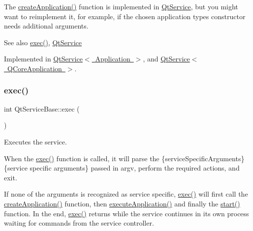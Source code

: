 The \mbox{\hyperlink{class_qt_service_base_ac5ae73935f489282b35c70b27b341390}{create\+Application()}} function is implemented in \mbox{\hyperlink{class_qt_service}{Qt\+Service}}, but you might want to reimplement it, for example, if the chosen application type\textquotesingle{}s constructor needs additional arguments.

\begin{DoxySeeAlso}{See also}
\mbox{\hyperlink{class_qt_service_base_afae2e589de71c1ae3ae8db3dc9ab9c64}{exec()}}, \mbox{\hyperlink{class_qt_service}{Qt\+Service}} 
\end{DoxySeeAlso}


Implemented in \mbox{\hyperlink{class_qt_service_a50aa2079345abfd0b1284be47e245b0b}{Qt\+Service$<$ Application $>$}}, and \mbox{\hyperlink{class_qt_service_a50aa2079345abfd0b1284be47e245b0b}{Qt\+Service$<$ Q\+Core\+Application $>$}}.

\mbox{\label{class_qt_service_base_afae2e589de71c1ae3ae8db3dc9ab9c64}} 
\subsubsection{\texorpdfstring{exec()}{exec()}}
{\footnotesize\ttfamily int Qt\+Service\+Base\+::exec (\begin{DoxyParamCaption}{ }\end{DoxyParamCaption})}

Executes the service.

When the \mbox{\hyperlink{class_qt_service_base_afae2e589de71c1ae3ae8db3dc9ab9c64}{exec()}} function is called, it will parse the  \{service\+Specific\+Arguments\} \{service specific arguments\} passed in {\ttfamily argv}, perform the required actions, and exit.

If none of the arguments is recognized as service specific, \mbox{\hyperlink{class_qt_service_base_afae2e589de71c1ae3ae8db3dc9ab9c64}{exec()}} will first call the \mbox{\hyperlink{class_qt_service_base_ac5ae73935f489282b35c70b27b341390}{create\+Application()}} function, then \mbox{\hyperlink{class_qt_service_base_ab70633cd29a22758dfa0502b77e564f6}{execute\+Application()}} and finally the \mbox{\hyperlink{class_qt_service_base_adbc0cd621b41bd3a6a1f62fda432e9e4}{start()}} function. In the end, \mbox{\hyperlink{class_qt_service_base_afae2e589de71c1ae3ae8db3dc9ab9c64}{exec()}} returns while the service continues in its own process waiting for commands from the service controller.

